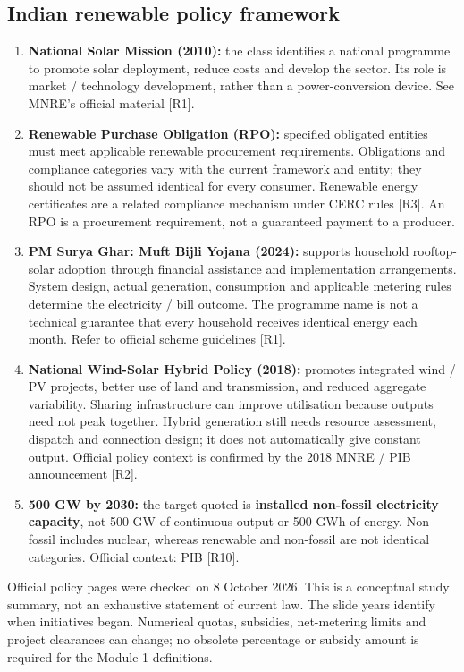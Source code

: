 \documentclass[11pt,a4paper]{article}
\newenvironment{Caution}[1]{\begin{tcolorbox}[colback=warm,colframe=rust,coltitle=white,title={#1}]}{\end{tcolorbox}}
\begin{document}
\subsection{Indian renewable policy framework}
\begin{enumerate}
\item \textbf{National Solar Mission (2010):} the class identifies a national programme to promote solar deployment, reduce costs and develop the sector. Its role is market / technology development, rather than a power-conversion device. See MNRE's official material [R1].
\item \textbf{Renewable Purchase Obligation (RPO):} specified obligated entities must meet applicable renewable procurement requirements. Obligations and compliance categories vary with the current framework and entity; they should not be assumed identical for every consumer. Renewable energy certificates are a related compliance mechanism under CERC rules [R3]. An RPO is a procurement requirement, not a guaranteed payment to a producer.
\item \textbf{PM Surya Ghar: Muft Bijli Yojana (2024):} supports household rooftop-solar adoption through financial assistance and implementation arrangements. System design, actual generation, consumption and applicable metering rules determine the electricity / bill outcome. The programme name is not a technical guarantee that every household receives identical energy each month. Refer to official scheme guidelines [R1].
\item \textbf{National Wind-Solar Hybrid Policy (2018):} promotes integrated wind / PV projects, better use of land and transmission, and reduced aggregate variability. Sharing infrastructure can improve utilisation because outputs need not peak together. Hybrid generation still needs resource assessment, dispatch and connection design; it does not automatically give constant output. Official policy context is confirmed by the 2018 MNRE / PIB announcement [R2].
\item \textbf{500 GW by 2030:} the target quoted is \textbf{installed non-fossil electricity capacity}, not 500 GW of continuous output or 500 GWh of energy. Non-fossil includes nuclear, whereas renewable and non-fossil are not identical categories. Official context: PIB [R10].
\end{enumerate}

\begin{Caution}{Date-sensitive material}
Official policy pages were checked on 8 October 2026. This is a conceptual study summary, not an exhaustive statement of current law. The slide years identify when initiatives began. Numerical quotas, subsidies, net-metering limits and project clearances can change; no obsolete percentage or subsidy amount is required for the Module 1 definitions.
\end{Caution}
\end{document}
